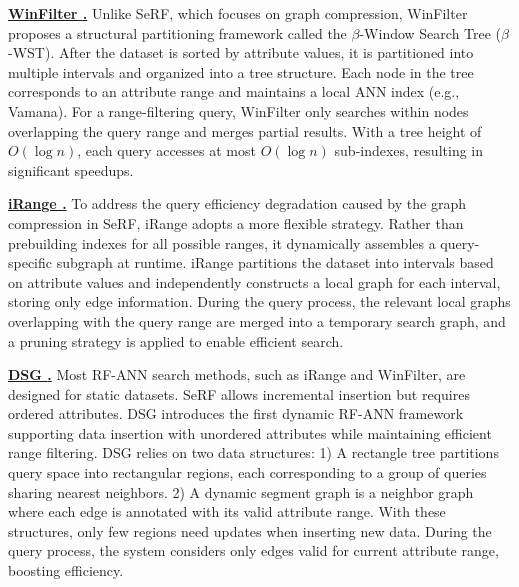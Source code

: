 \documentclass[sigconf, nonacm]{acmart}
\begin{document}
\noindent\textbf{\underline{WinFilter \cite{winFilter}.}}  
Unlike SeRF, which focuses on graph compression, WinFilter proposes a structural partitioning framework called the $\beta$-Window Search Tree ($\beta$-WST). After the dataset is sorted by attribute values, it is partitioned into multiple intervals and organized into a tree structure. Each node in the tree corresponds to an attribute range and maintains a local ANN index (e.g., Vamana). For a range-filtering query, WinFilter only searches within nodes overlapping the query range and merges partial results. With a tree height of $O(\log n)$, each query accesses at most $O(\log n)$ sub-indexes, resulting in significant speedups.


\noindent\textbf{\underline{iRange \cite{iRangeGraph}.}}  
To address the query efficiency degradation caused by the graph compression in SeRF, iRange adopts a more flexible strategy. Rather than prebuilding indexes for all possible ranges, it dynamically assembles a query-specific subgraph at runtime. iRange partitions the dataset into intervals based on attribute values and independently constructs a local graph for each interval, storing only edge information. During the query process, the relevant local graphs overlapping with the query range are merged into a temporary search graph, and a pruning strategy is applied to enable efficient search.


\noindent\textbf{\underline{DSG \cite{DSG}.}}   
Most RF-ANN search methods, such as iRange and WinFilter, are designed for static datasets. SeRF allows incremental insertion but requires ordered attributes. DSG introduces the first dynamic RF-ANN framework supporting data insertion with unordered attributes while maintaining efficient range filtering.
DSG relies on two data structures: 1) A rectangle tree partitions query space into rectangular regions, each corresponding to a group of queries sharing nearest neighbors. 2) A dynamic segment graph is a neighbor graph where each edge is annotated with its valid attribute range.
With these structures, only few regions need updates when inserting new data. During the query process, the system considers only edges valid for current attribute range, boosting efficiency.
\end{document}
